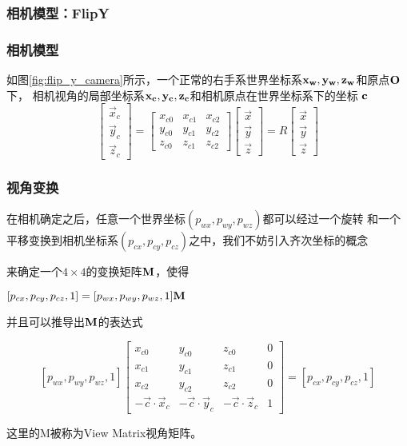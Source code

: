 
\begin{frame}
    \frametitle{相机模型：FlipY}
    
\end{frame}

\begin{frame}
    \frametitle{相机模型}
    如图\ref{fig:flip_y_camera}所示，一个正常的右手系世界坐标系$\bf{x_w,y_w,z_w}$和原点$\bf{O}$下，
    相机视角的局部坐标系$\bf{x_c,y_c,z_c}$和相机原点在世界坐标系下的坐标 $\bf{c}$
    $$\left[\begin{matrix} 
        \vec{x}_c \\ \vec{y}_c \\ \vec{z}_c 
    \end{matrix}\right]=
    \left[\begin{matrix} 
        x_{c0} & x_{c1} & x_{c2} \\ 
        y_{c0} & y_{c1} & y_{c2} \\ 
        z_{c0} & z_{c1} & z_{c2} 
    \end{matrix}\right]
    \left[\begin{matrix} 
        \vec{x} \\ \vec{y} \\ \vec{z} 
    \end{matrix}\right]=
    R\left[\begin{matrix} 
        \vec{x} \\ \vec{y} \\ \vec{z} 
    \end{matrix}\right]$$
\end{frame}

\begin{frame}
    \frametitle{视角变换}

    在相机确定之后，任意一个世界坐标$(p_{wx},p_{wy},p_{wz})$都可以经过一个旋转
    和一个平移变换到相机坐标系$(p_{cx},p_{cy},p_{cz})$之中，我们不妨引入齐次坐标的概念
    
    来确定一个$4\times 4$的变换矩阵$\bf{M}$，使得
    
    $[p_{cx},p_{cy},p_{cz},1]=[p_{wx},p_{wy},p_{wz},1]\bf{M}$
    
    并且可以推导出$\bf{M}$的表达式
    
    $$[p_{wx},p_{wy},p_{wz},1]
    \left[\begin{matrix} 
        x_{c0} & y_{c0} & z_{c0} & 0 \\ 
        x_{c1} & y_{c1} & z_{c1} & 0 \\ 
        x_{c2} & y_{c2} & z_{c2} & 0 \\ 
        -\vec{c}\cdot\vec{x}_c &-\vec{c}\cdot\vec{y}_c &-\vec{c}\cdot\vec{z}_c & 1 
    \end{matrix}\right]=[p_{cx},p_{cy},p_{cz}, 1]$$
    
    这里的M被称为View Matrix视角矩阵。
\end{frame}
